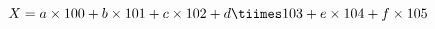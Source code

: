 \documentclass{article}
\begin{document}
$X = a\times 100 + b \times 101 + c \times 102 + d \tiimes 103 + e \times 104 + f \times 105$
\end{document}
